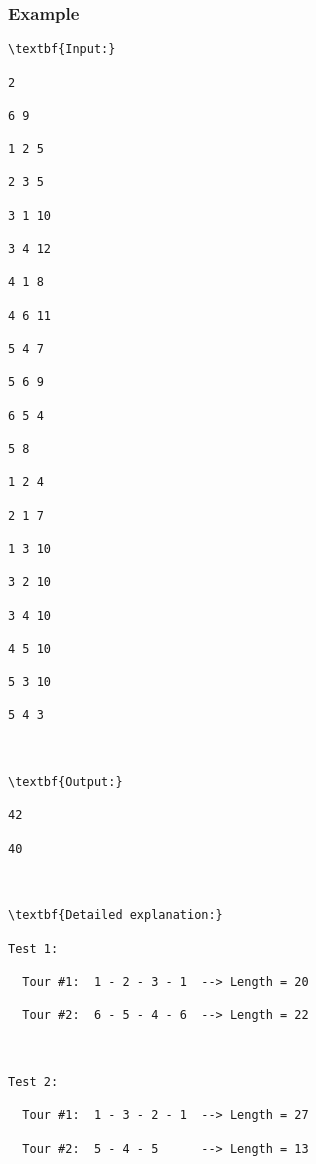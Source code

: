 \subsubsection{Example}
\begin{verbatim}
\textbf{Input:}

2

6 9

1 2 5

2 3 5

3 1 10

3 4 12

4 1 8

4 6 11

5 4 7

5 6 9

6 5 4

5 8

1 2 4

2 1 7

1 3 10

3 2 10

3 4 10

4 5 10

5 3 10

5 4 3



\textbf{Output:}

42

40



\textbf{Detailed explanation:}

Test 1:

  Tour #1:  1 - 2 - 3 - 1  --> Length = 20

  Tour #2:  6 - 5 - 4 - 6  --> Length = 22



Test 2:

  Tour #1:  1 - 3 - 2 - 1  --> Length = 27

  Tour #2:  5 - 4 - 5      --> Length = 13



\end{verbatim}
